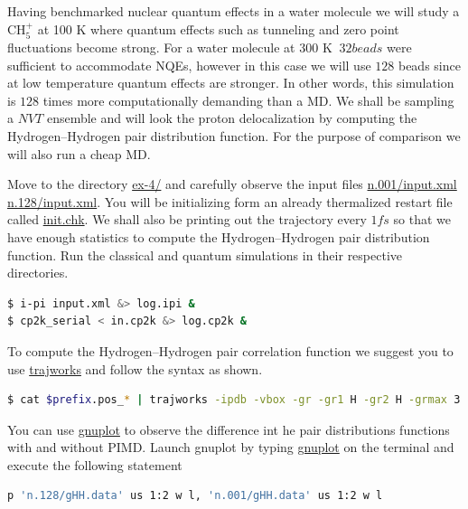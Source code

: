 \documentclass{article}
\begin{document}
\begin{Exercise}[label={basic},title={PIMD in the strong quantum regime:  gas phase Methanium}]
\noindent Having benchmarked nuclear quantum effects in a water molecule we will study a $\text{CH}_{5}^{+}$ at 100 K where quantum effects such as tunneling and zero point fluctuations become strong. For a water molecule at 300 K $~ 32 beads$ were sufficient to accommodate NQEs, however in this case we will use $128$ beads since at low temperature quantum effects are stronger. In other words, this simulation is $128$ times more computationally demanding than a MD. We shall be sampling a $NVT$ ensemble and will look the proton delocalization by computing the Hydrogen--Hydrogen pair distribution function. For the purpose of comparison we will also run a cheap MD.

\Question
Move to the directory \url{ex-4/} and carefully observe the\ipi{} input files \url{n.001/input.xml} \url{n.128/input.xml}. You will be initializing form an already thermalized restart file called \url{init.chk}. We shall also be printing out the trajectory every $1 fs$ so that we have enough statistics to compute the Hydrogen--Hydrogen pair distribution function. Run the classical and quantum simulations in their respective directories.

\begin{lstlisting}[language=bash]
$ i-pi input.xml &> log.ipi &
$ cp2k_serial < in.cp2k &> log.cp2k &
\end{lstlisting}

\Question
To compute the Hydrogen--Hydrogen pair correlation function we suggest you to use \url{trajworks} and follow the syntax as shown. 
\begin{lstlisting}[language=bash]
$ cat $prefix.pos_* | trajworks -ipdb -vbox -gr -gr1 H -gr2 H -grmax 3 -hwin triangle -hwinfac 5  > gHH.data 
\end{lstlisting}

\Question
You can use \url{gnuplot} to observe the difference int he pair distributions functions with and without PIMD. Launch gnuplot by typing \url{gnuplot} on the terminal and execute the following statement 
\begin{lstlisting}[language=bash]
p 'n.128/gHH.data' us 1:2 w l, 'n.001/gHH.data' us 1:2 w l
\end{lstlisting}

\end{Exercise}



\end{document}
